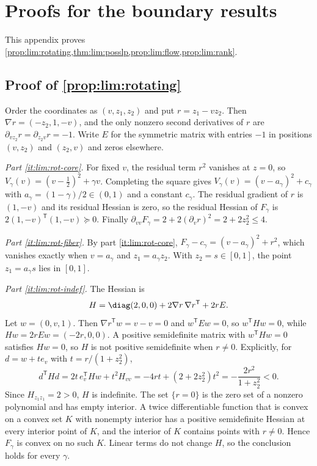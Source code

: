 \section{Proofs for the boundary results}\label{app:lim}

This appendix proves \cref{prop:lim:rotating,thm:lim:posslp,prop:lim:flow,prop:lim:rank}.

\subsection{Proof of \texorpdfstring{\cref{prop:lim:rotating}}{the rotating-fiber proposition}}\label{app:lim:rotating}

Order the coordinates as $(v,z_1,z_2)$ and put $r=z_1-vz_2$. Then
$\nabla r=(-z_2,1,-v)$, and the only nonzero second derivatives of $r$ are
$\partial_{vz_2}r=\partial_{z_2v}r=-1$. Write $E$ for the symmetric matrix
with entries $-1$ in positions $(v,z_2)$ and $(z_2,v)$ and zeros elsewhere.

\emph{Part \ref{it:lim:rot-core}.} For fixed $v$, the residual term $r^2$
vanishes at $z=0$, so $V_\gamma(v)=(v-\frac12)^2+\gamma v$. Completing the
square gives $V_\gamma(v)=(v-a_\gamma)^2+c_\gamma$ with
$a_\gamma=(1-\gamma)/2\in(0,1)$ and a constant $c_\gamma$. The residual
gradient of $r$ is $(1,-v)$ and its residual Hessian is zero, so the
residual Hessian of $F_\gamma$ is $2(1,-v)^{\mathsf T}(1,-v)\succeq0$. Finally
$\partial_{vv}F_\gamma=2+2(\partial_vr)^2=2+2z_2^2\le4$.

\emph{Part \ref{it:lim:rot-fiber}.} By part \ref{it:lim:rot-core},
$F_\gamma-c_\gamma=(v-a_\gamma)^2+r^2$, which vanishes exactly when
$v=a_\gamma$ and $z_1=a_\gamma z_2$. With $z_2=s\in[0,1]$, the point
$z_1=a_\gamma s$ lies in $[0,1]$.

\emph{Part \ref{it:lim:rot-indef}.} The Hessian is
\[
 H=\diag(2,0,0)+2\nabla r\,\nabla r^{\mathsf T}+2rE .
\]
Let $w=(0,v,1)$. Then $\nabla r^{\mathsf T}w=v-v=0$ and $w^{\mathsf T}Ew=0$,
so $w^{\mathsf T}Hw=0$, while $Hw=2rEw=(-2r,0,0)$. A positive semidefinite
matrix with $w^{\mathsf T}Hw=0$ satisfies $Hw=0$, so $H$ is not positive
semidefinite when $r\ne0$. Explicitly, for $d=w+te_v$ with
$t=r/(1+z_2^2)$,
\[
 d^{\mathsf T}Hd=2t\,e_v^{\mathsf T}Hw+t^2H_{vv}
 =-4rt+(2+2z_2^2)t^2=-\frac{2r^2}{1+z_2^2}<0 .
\]
Since $H_{z_1z_1}=2>0$, $H$ is indefinite. The set $\{r=0\}$ is the zero
set of a nonzero polynomial and has empty interior. A twice differentiable
function that is convex on a convex set $K$ with nonempty interior has a
positive semidefinite Hessian at every interior point of $K$, and the
interior of $K$ contains points with $r\ne0$. Hence $F_\gamma$ is convex on
no such $K$. Linear terms do not change $H$, so the conclusion holds for
every $\gamma$.

